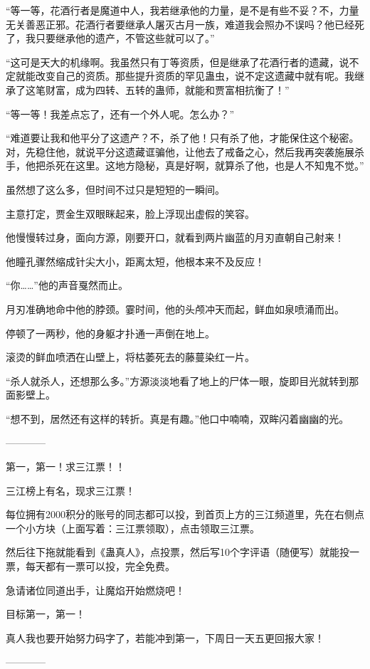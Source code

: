 \begin{this_body}
“等一等，花酒行者是魔道中人，我若继承他的力量，是不是有些不妥？不，力量无关善恶正邪。花酒行者要继承人屠灭古月一族，难道我会照办不误吗？他已经死了，我只要继承他的遗产，不管这些就可以了。”

“这可是天大的机缘啊。我虽然只有丁等资质，但是继承了花酒行者的遗藏，说不定就能改变自己的资质。那些提升资质的罕见蛊虫，说不定这遗藏中就有呢。我继承了这笔财富，成为四转、五转的蛊师，就能和贾富相抗衡了！”

“等一等！我差点忘了，还有一个外人呢。怎么办？”

“难道要让我和他平分了这遗产？不，杀了他！只有杀了他，才能保住这个秘密。对，先稳住他，就说平分这遗藏诓骗他，让他去了戒备之心，然后我再突袭施展杀手，他把杀死在这里。这地方隐秘，真是好啊，就算杀了他，也是人不知鬼不觉。”

虽然想了这么多，但时间不过只是短短的一瞬间。

主意打定，贾金生双眼眯起来，脸上浮现出虚假的笑容。

他慢慢转过身，面向方源，刚要开口，就看到两片幽蓝的月刃直朝自己射来！

他瞳孔骤然缩成针尖大小，距离太短，他根本来不及反应！

“你……”他的声音戛然而止。

月刃准确地命中他的脖颈。霎时间，他的头颅冲天而起，鲜血如泉喷涌而出。

停顿了一两秒，他的身躯才扑通一声倒在地上。

滚烫的鲜血喷洒在山壁上，将枯萎死去的藤蔓染红一片。

“杀人就杀人，还想那么多。”方源淡淡地看了地上的尸体一眼，旋即目光就转到那面影壁上。

“想不到，居然还有这样的转折。真是有趣。”他口中喃喃，双眸闪着幽幽的光。

------------

第一，第一！求三江票！！

三江榜上有名，现求三江票！

每位拥有2000积分的账号的同志都可以投，到首页上方的三江频道里，先在右侧点一个小方块（上面写着：三江票领取），点击领取三江票。

然后往下拖就能看到《蛊真人》，点投票，然后写10个字评语（随便写）就能投一票，每天都有一票可以投，完全免费。

急请诸位同道出手，让魔焰开始燃烧吧！

目标第一，第一！

真人我也要开始努力码字了，若能冲到第一，下周日一天五更回报大家！

------------

\end{this_body}

